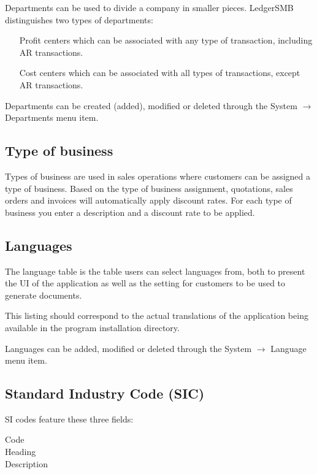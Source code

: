 Departments can be used to divide a company in smaller pieces. LedgerSMB distinguishes two
types of departments:

\begin{itemize}
\item [Profit centers] which can be associated with any type of transaction, including AR transactions.
\item [Cost centers] which can be associated with all types of transactions, except AR transactions.
\end{itemize}

Departments can be created (added), modified or deleted through the System $\rightarrow$ Departments menu item.

\subsection{Type of business}
\label{subsec-company-config-business-types}

Types of business are used in sales operations where customers can be assigned a type
of business. Based on the type of business assignment, quotations, sales orders and
invoices will automatically apply discount rates. For each type of business you enter a description and a discount rate to be applied.

\subsection{Languages}
\label{subsec-company-config-languages}

The language table is the table users can select languages from, both to present
the UI of the application as well as the setting for customers to be used to generate
documents.

This listing should correspond to the actual translations of the application being
available in the program installation directory.

Languages can be added, modified or deleted through the System $\rightarrow$ Language menu item.

\subsection{Standard Industry Code (SIC)}
\label{subsec-company-config-sic}

SI codes feature these three fields:

\begin{description}
\item [Code]
\item [Heading]
\item [Description]
\end{description}

